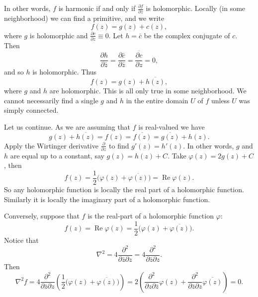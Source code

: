 \documentclass[12pt,openany]{book}
\renewcommand{\Re}{\operatorname{Re}}
\theoremstyle{plain}
\theoremstyle{remark}
\theoremstyle{definition}
\theoremstyle{exercise}
\theoremstyle{example}
\begin{document}
In other words, $f$ is harmonic if and only if $\frac{\partial f}{\partial
z}$ is holomorphic.  Locally (in some neighborhood) we can find a
primitive, and we write
\begin{equation*}
f(z) = g(z) + c(z) ,
\end{equation*}
where $g$ is holomorphic and $\frac{\partial c}{\partial z} \equiv 0$.
Let $h = \bar{c}$ be the complex conjugate of $c$.  Then 
\begin{equation*}
\frac{\partial h}{\partial \bar{z}}
=
\frac{\partial \bar{c}}{\partial \bar{z}}
=
\overline{
\frac{\partial c}{\partial z}
}
=
0 ,
\end{equation*}
and so $h$ is holomorphic.  Thus
\begin{equation*}
f(z) = g(z) + \overline{h(z)} ,
\end{equation*}
where $g$ and $h$ are holomorphic.  This is all only true in some
neighborhood.  We cannot necessarily find a single $g$ and $h$ in the entire
domain $U$ of $f$ unless $U$ was simply connected.

Let us continue.  As we are assuming that $f$ is real-valued we have
\begin{equation*}
g(z) + \overline{h(z)} = f(z) = \overline{f(z)} = \overline{g(z)} + h(z).
\end{equation*}
Apply the Wirtinger derivative $\frac{\partial}{\partial z}$ to find
$g'(z) = h'(z)$.  In other words, $g$ and $h$ are equal up to a constant,
say $g(z) = h(z) + C$.  Take $\varphi(z) = 2 g(z) + C$, then
\begin{equation*}
f(z) = \frac{1}{2} \bigl( \varphi(z) + \overline{\varphi(z)} \bigr) 
= \Re \varphi(z).
\end{equation*}
So any holomorphic function is locally the real part of a holomorphic
function.  Similarly it is locally the imaginary part of a holomorphic
function.

Conversely,
suppose that $f$ is the real-part of a holomorphic function $\varphi$:
\begin{equation*}
f(z) = \Re \varphi(z) =
\frac{1}{2}\bigl( \varphi(z) + \overline{\varphi(z)} \bigr) .
\end{equation*}
Notice that
\begin{equation*}
\nabla^2 =
4 \frac{\partial^2}{\partial \bar{z} \partial z}
=
4 \frac{\partial^2}{\partial \bar{z} \partial z} .
\end{equation*}
Then
\begin{equation*}
\nabla^2 f =
4 \frac{\partial^2}{\partial \bar{z} \partial z}
\left(
\frac{1}{2}\bigl( \varphi(z) + \overline{\varphi(z)} \bigr)
\right)
=
2
\left(
\frac{\partial^2}{\partial z \partial \bar{z}}
\varphi(z) +
\frac{\partial^2}{\partial \bar{z} \partial z}
\overline{\varphi(z)}
\right)
=
0 .
\end{equation*}
\end{document}

